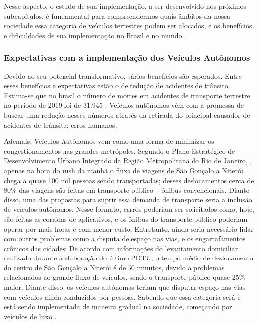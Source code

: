 Nesse aspecto, o estudo de sua implementação, a ser desenvolvido nos próximos subcapítulos, é fundamental para compreendermos quais âmbitos da nossa sociedade essa categoria de veículos terrestres podem ser alocados, e os benefícios e dificuldades de sua implementação no Brasil e no mundo.

 \subsubsection{Expectativas com a implementação dos Veículos Autônomos}
Devido ao seu potencial transformativo, vários benefícios são esperados. Entre esses benefícios e expectativas estão o de redução de acidentes de trânsito. Estima-se que no brasil o número de mortes em acidentes de transporte terrestre no período de 2019 foi de 31.945 \cite{Anexo_I_pnatrans}. Veículos autônomos vêm com a promessa de buscar uma redução nesses números através da retirada do principal causador de acidentes de trânsito: erros humanos. 

Ademais, Veículos Autônomos vem como uma forma de minimizar os congestionamentos nas grandes metrópoles. Segundo o  Plano Estratégico de Desenvolvimento Urbano Integrado da Região Metropolitana do Rio de Janeiro, \cite{rj_transito}, apenas na hora do rush da manhã o fluxo de viagens de São Gonçalo a Niterói chega a quase 100 mil pessoas sendo transportadas; desses deslocamentos cerca de 80\% das viagens são feitas em transporte público – ônibus convencionais. Diante disso, uma das propostas para suprir essa demanda de transporte seria a inclusão de veículos autônomos. Nesse formato, carros poderiam ser solicitados como, hoje, são feitas as corridas de aplicativos, e os ônibus do transporte público  poderiam operar por mais horas e com menor custo. 
Entretanto, ainda seria necessário lidar com outros problemas como a disputa de espaço nas vias, e os engarrafamentos crônicos das cidades; De acordo com informações do levantamento domiciliar realizado durante a elaboração do último PDTU, o tempo médio de deslocamento do centro de São Gonçalo a Niterói é de 50 minutos, devido a problemas relacionados ao grande fluxo de veículos, sendo o transporte público quase 25\% maior. Diante disso, os veículos autônomos teriam que disputar espaço nas vias com veículos ainda conduzidos por pessoas. Sabendo que essa categoria será e está sendo implementada de maneira gradual na sociedade, começando por veículos de luxo \cite{caio}.

